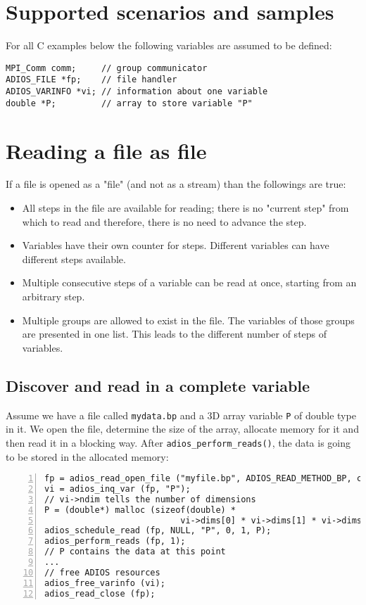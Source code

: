 \section{Supported scenarios and samples}

For all C examples below the following variables are assumed to be defined:
\begin{lstlisting}[frame=none]
MPI_Comm comm;     // group communicator
ADIOS_FILE *fp;    // file handler
ADIOS_VARINFO *vi; // information about one variable
double *P;         // array to store variable "P"
\end{lstlisting}


\section{Reading a file as file}
If a file is opened as a "file" (and not as a stream) than the followings are true:

  \begin{itemize}
  \item All steps in the file are available for reading; there is no "current step" from which to read and therefore, there is no need to advance the step.
  \item Variables have their own counter for steps. Different variables can have different steps available.
  \item Multiple consecutive steps of a variable can be read at once, starting from an arbitrary step.
  \item Multiple groups are allowed to exist in the file. The variables of those groups are presented in one list. This leads to the different number of steps of variables.
  \end{itemize}


\subsection{Discover and read in a complete variable}
Assume we have a file called \verb+mydata.bp+ and a 3D array variable \verb+P+ of double type in it. We open the file, determine the size of the array, allocate memory for it and then read it in a blocking way. After \verb+adios_perform_reads()+,  the data is going to be stored in the allocated memory:

\begin{lstlisting}[numbers=left, numberstyle=\color{gray}, stepnumber=2,
                             caption={Read a complete array from a file}, label=code:file_read_var]
fp = adios_read_open_file ("myfile.bp", ADIOS_READ_METHOD_BP, comm);
vi = adios_inq_var (fp, "P");
// vi->ndim tells the number of dimensions
P = (double*) malloc (sizeof(double) * 
                           vi->dims[0] * vi->dims[1] * vi->dims[2]);
adios_schedule_read (fp, NULL, "P", 0, 1, P);
adios_perform_reads (fp, 1);   
// P contains the data at this point
...
// free ADIOS resources
adios_free_varinfo (vi); 
adios_read_close (fp);
\end{lstlisting}


